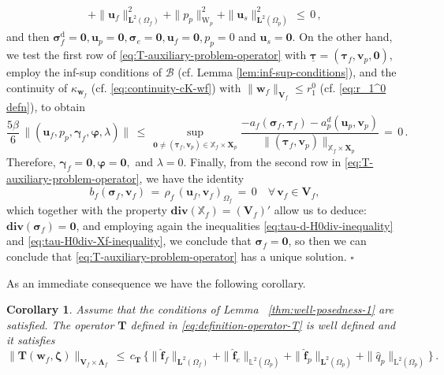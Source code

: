 \documentclass[11pt]{article}
\numberwithin{equation}{section}
\newcommand{\bgamma}{{\boldsymbol\gamma}}
\newcommand{\bLambda}{{\boldsymbol\Lambda}}
\newcommand{\bsi}{{\boldsymbol\sigma}}
\newcommand{\bvarphi}{{\boldsymbol\varphi}}
\newcommand{\btau}{{\boldsymbol\tau}}
\newcommand{\bzeta}{{\boldsymbol\zeta}}
\newcommand{\ubtau}{\underline{\btau}}
\newcommand{\bv}{{\mathbf{v}}}
\newcommand{\bw}{{\mathbf{w}}}
\newcommand{\f}{\mathbf{f}}
\newcommand{\bu}{\mathbf{u}}
\newcommand{\0}{{\mathbf{0}}}
\def\bX{\mathbf{X}}
\def\bV{\mathbf{V}}
\def\bT{\mathbf{T}}
\newcommand{\bL}{\mathbf{L}}
\newcommand\bbX{\mathbb{X}}
\newcommand\bbL{\mathbb{L}}
\newcommand{\cB}{\mathcal{B}}
\def\L{\mathrm{L}}
\def\W{\mathrm{W}}
\def\rd{\mathrm{d}}
\def\bdiv{\mathbf{div}}
\def\wh{\widehat}
\newtheorem{cor}[thm]{Corollary}
\newenvironment{proof}{\noindent{\it Proof.}}{\hfill$\square$}
\numberwithin{equation}{section}
\begin{document}
\begin{proof}
\begin{align*}
+ \|\bu_f\|^2_{\bL^2(\Omega_f)}
+ \|p_p\|^2_{\W_p}
+ \|\bu_s\|^2_{\bL^2(\Omega_p)} \,\leq\, 0\,, %
\end{align*}
and then $\bsi^\rd_f = \0, \bu_p = \0, \bsi_e = \0, \bu_f = \0, p_p = 0$ and $\bu_s = \0$. 
On the other hand, we test the first row of \eqref{eq:T-auxiliary-problem-operator} with $\ubtau=(\btau_f,\bv_p,\0)$, employ the inf-sup conditions of $\cB$ (cf. Lemma \ref{lem:inf-sup-conditions}), and the continuity of $\kappa_{\bw_f}$ (cf. \eqref{eq:continuity-cK-wf}) with $\|\bw_f\|_{\bV_f}\leq r_1^0$ (cf. \eqref{eq:r_1^0 defn}), to obtain
\begin{equation}\label{eq:sol-uniqueness-4.8-3}
\frac{5\beta}{6}\,\|(\bu_f ,p_p, \bgamma_f, \bvarphi, \lambda)\|
\,\leq\, \sup_{\0\neq (\btau_f,\bv_p)\in \bbX_{f}\times \bX_p}  \frac{-a_f(\bsi_f,\btau_f) - a^d_p(\bu_p ,\bv_p)}{\|(\btau_f,\bv_p)\|_{\bbX_f\times \bX_p}} \,=\, 0\,.
\end{equation}
Therefore, $\bgamma_f = \0, \bvarphi = \0,$ and  $\lambda = 0 $. Finally, from the second row in \eqref{eq:T-auxiliary-problem-operator}, we have the identity
\begin{equation*}
b_f(\bsi_f ,\bv_f) 
\, = \,  \rho_f\,(\bu_f,\bv_f)_{\Omega_f} \,=\, 0 \quad \forall\,\bv_f\in \bV_f, 
\end{equation*}
which together with the property $\bdiv(\bbX_f) = (\bV_f)'$ allow us to deduce: $\bdiv(\bsi_f) = \0$, and employing again the inequalities \eqref{eq:tau-d-H0div-inequality} and \eqref{eq:tau-H0div-Xf-inequality}, we conclude that $\bsi_f = \0$, so then we can conclude that \eqref{eq:T-auxiliary-problem-operator} has a unique solution.
\end{proof}

As an immediate consequence we have the following corollary.
%
\begin{cor}\label{eq:T-well-delfined}
Assume that the conditions of Lemma ~\ref{thm:well-posedness-1} are satisfied. The operator $\bT$ defined in \eqref{eq:definition-operator-T} is well defined and it satisfies
\begin{equation}\label{eq:operator T-bound-solution}
\|\bT(\bw_f,\bzeta)\|_{\bV_f\times \bLambda_f} 
\,\leq\, {c_\bT\,\Big\{ \|\wh{\f}_f\|_{\bL^2(\Omega_f)} +  \|\wh{\f}_e\|_{\bbL^2(\Omega_p)}+ \|\wh{\f}_p\|_{\bL^2(\Omega_p)} +  \| \wh{q}_p\|_{\L^2(\Omega_p)} \Big\}}\,.
\end{equation}
\end{cor}

\end{document}
